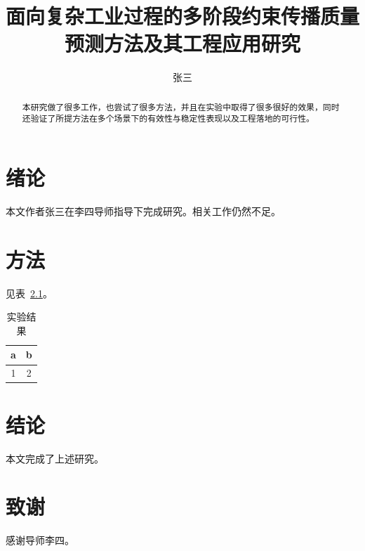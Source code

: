 \documentclass{generic}
\title{面向复杂工业过程的多阶段约束传播质量预测方法及其工程应用研究}
\author{张三}
\begin{document}
\begin{abstract}
本研究做了很多工作，也尝试了很多方法，并且在实验中取得了很多很好的效果，同时还验证了所提方法在多个场景下的有效性与稳定性表现以及工程落地的可行性。
\end{abstract}
\chapter{绪论}
本文作者张三在李四导师指导下完成研究。相关工作仍然不足。
\chapter{方法}
见表~\ref{tab:bad}。
\begin{table}[htbp]
\caption{实验结果}
\label{tab:bad}
\begin{tabular}{|c|c|}
\hline
a & b \\
\hline
1 & 2 \\
\hline
\end{tabular}
\end{table}
\chapter{结论}
本文完成了上述研究。
\chapter{致谢}
感谢导师李四。

\end{document}
